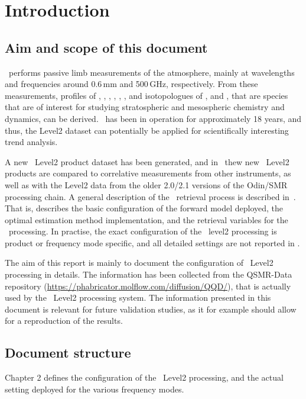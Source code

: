 \chapter{Introduction}
\label{chapter:introduction}


\setcounter{page}{1}


\section{Aim and scope of this document}
\label{sec:aim}
\smr\ performs passive limb measurements of the atmosphere,
mainly at wavelengths and frequencies around 0.6\,mm and 500\,GHz,
respectively.
From these measurements, profiles of 
, , , , 
, , and isotopologues of , and ,
that are species that are of interest for studying stratospheric and 
mesospheric chemistry and dynamics, can be derived. 
\smr\ has been in operation for approximately 18 years, and thus, the Level2
dataset can potentially be applied for scientifically interesting trend analysis.

A new \smr\ Level2 product dataset has been generated, and in~\cite{dds}
thew new \smr\ Level2 products are compared to correlative measurements from other
instruments, as well as with the Level2 data from the older 2.0/2.1 versions of
the Odin/SMR processing chain. A general description
of the \smr\ retrieval process is described in~\cite{atbdl2}. That is, 
\cite{atbdl2} describes the basic configuration of the forward
model deployed, the optimal estimation method implementation, and the retrieval
variables for the \smr\ processing. In practise, the exact configuration
of the \smr\ level2 processing is product or frequency mode specific,
and all detailed settings are not reported in \cite{atbdl2}.

The aim of this report is mainly to document the configuration of \smr\ Level2 processing
in details. The information has been collected from the QSMR-Data repository
(\url{https://phabricator.molflow.com/diffusion/QQD/}), that is actually used
by the \smr\ Level2 processing system. 
The information presented in this document is relevant for future validation studies,
as it for example should allow for a reproduction of the results.
 

\section{Document structure}

Chapter 2 defines the configuration of the \smr\ Level2
processing, and the actual setting deployed for the various
frequency modes.  
